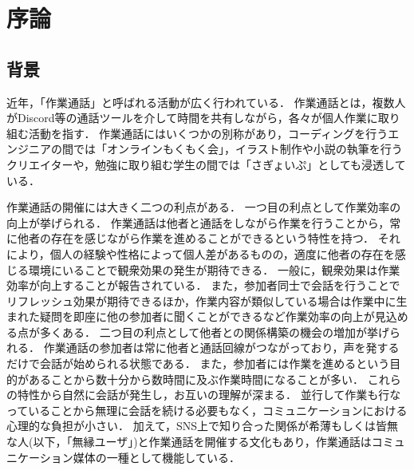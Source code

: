 \chapter{序論\label{sec:introduction}}
\thispagestyle{plain}

\section{背景}

近年，「作業通話」と呼ばれる活動が広く行われている．
作業通話とは，複数人がDiscord\cite{Discord}等の通話ツールを介して時間を共有しながら，各々が個人作業に取り組む活動を指す．
作業通話にはいくつかの別称があり，コーディングを行うエンジニアの間では「オンラインもくもく会」，イラスト制作や小説の執筆を行うクリエイターや，勉強に取り組む学生の間では「さぎょいぷ」としても浸透している．

作業通話の開催には大きく二つの利点がある．
一つ目の利点として作業効率の向上が挙げられる．
作業通話は他者と通話をしながら作業を行うことから，常に他者の存在を感じながら作業を進めることができるという特性を持つ．
それにより，個人の経験や性格によって個人差があるものの，適度に他者の存在を感じる環境にいることで観衆効果の発生が期待できる．
一般に，観衆効果は作業効率が向上することが報告されている\cite{Zajonc}\cite{Matsumoto}\cite{Miyamoto}．
また，参加者同士で会話を行うことでリフレッシュ効果が期待できるほか，作業内容が類似している場合は作業中に生まれた疑問を即座に他の参加者に聞くことができるなど作業効率の向上が見込める点が多くある．
二つ目の利点として他者との関係構築の機会の増加が挙げられる．
作業通話の参加者は常に他者と通話回線がつながっており，声を発するだけで会話が始められる状態である．
また，参加者には作業を進めるという目的があることから数十分から数時間に及ぶ作業時間になることが多い．
これらの特性から自然に会話が発生し，お互いの理解が深まる．
並行して作業も行なっていることから無理に会話を続ける必要もなく，コミュニケーションにおける心理的な負担が小さい．
加えて，SNS上で知り合った関係が希薄もしくは皆無な人(以下，「無縁ユーザ」)と作業通話を開催する文化もあり，作業通話はコミュニケーション媒体の一種として機能している．

